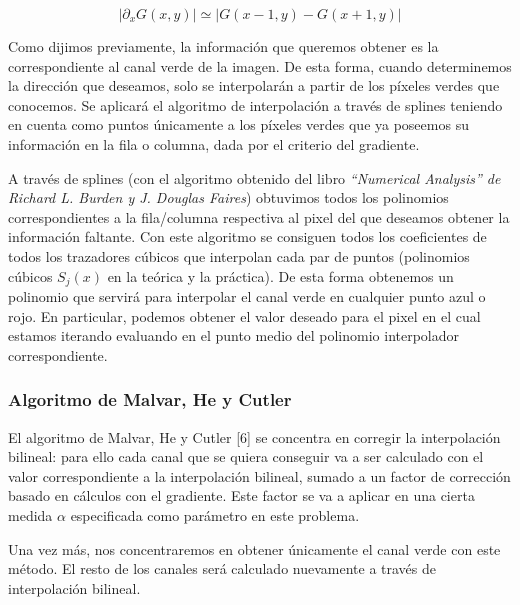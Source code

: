 \[ |\partial_xG(x,y)| \simeq |G(x -1, y) - G(x+1,y)| \]

\vspace{\baselineskip}

Como dijimos previamente, la información que queremos obtener es la correspondiente al canal verde de la imagen. De esta forma, cuando determinemos la dirección que deseamos, solo se interpolarán a partir de los píxeles verdes que conocemos. Se aplicará el algoritmo de interpolación a través de splines teniendo en cuenta como puntos únicamente a los píxeles verdes que ya poseemos su información en la fila o columna, dada por el criterio del gradiente.

\vspace{\baselineskip}

A través de splines (con el algoritmo obtenido del libro \textit{``Numerical Analysis'' de Richard L. Burden y J. Douglas Faires}) obtuvimos todos los polinomios correspondientes a la fila/columna respectiva al pixel del que deseamos obtener la información faltante. Con este algoritmo se consiguen todos los coeficientes de todos los trazadores cúbicos que interpolan cada par de puntos (polinomios cúbicos $S_j(x)$ en la teórica y la práctica). De esta forma obtenemos un polinomio que servirá para interpolar el canal verde en cualquier punto azul o rojo. En particular, podemos obtener el valor deseado para el pixel en el cual estamos iterando evaluando en el punto medio del polinomio interpolador correspondiente.

\subsubsection{Algoritmo de Malvar, He y Cutler}

El algoritmo de Malvar, He y Cutler [6] se concentra en corregir la interpolación bilineal: para ello cada canal que se quiera conseguir va a ser calculado con el valor correspondiente a la interpolación bilineal, sumado a un factor de corrección basado en cálculos con el gradiente. Este factor se va a aplicar en una cierta medida $\alpha$ especificada como parámetro en este problema.

\vspace{\baselineskip}

Una vez más, nos concentraremos en obtener únicamente el canal verde con este método. El resto de los canales será calculado nuevamente a través de  interpolación bilineal.

\vspace{\baselineskip}

